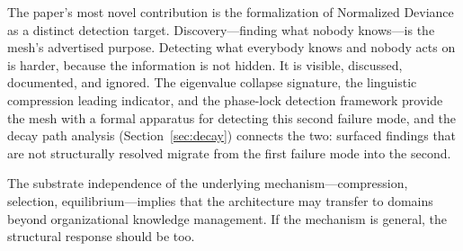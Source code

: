 \documentclass[11pt,a4paper]{article}
\begin{document}
The paper's most novel contribution is the formalization of Normalized Deviance as a distinct detection target. Discovery---finding what nobody knows---is the mesh's advertised purpose. Detecting what everybody knows and nobody acts on is harder, because the information is not hidden. It is visible, discussed, documented, and ignored. The eigenvalue collapse signature, the linguistic compression leading indicator, and the phase-lock detection framework provide the mesh with a formal apparatus for detecting this second failure mode, and the decay path analysis (Section~\ref{sec:decay}) connects the two: surfaced findings that are not structurally resolved migrate from the first failure mode into the second.

The substrate independence of the underlying mechanism---compression, selection, equilibrium---implies that the architecture may transfer to domains beyond organizational knowledge management. If the mechanism is general, the structural response should be too.
\end{document}
